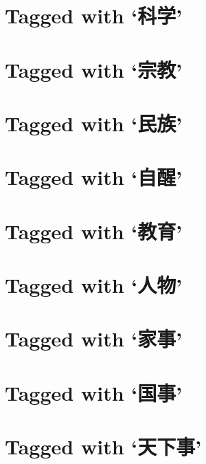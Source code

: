\section*{Tagged with `\textbf{科学}'}

\section*{Tagged with `\textbf{宗教}'}

\section*{Tagged with `\textbf{民族}'}

\section*{Tagged with `\textbf{自醒}'}

\section*{Tagged with `\textbf{教育}'}

\section*{Tagged with `\textbf{人物}'}

\section*{Tagged with `\textbf{家事}'}

\section*{Tagged with `\textbf{国事}'}

\section*{Tagged with `\textbf{天下事}'}
